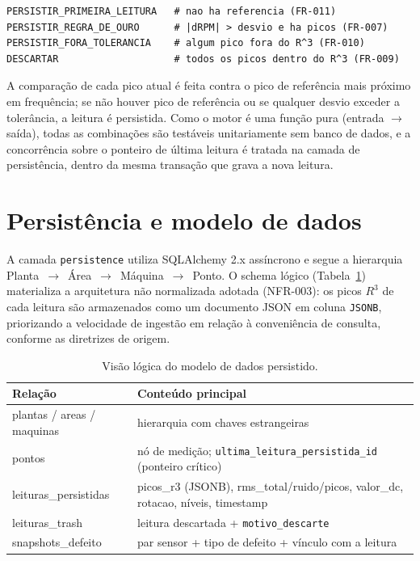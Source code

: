 \begin{verbatim}
PERSISTIR_PRIMEIRA_LEITURA   # nao ha referencia (FR-011)
PERSISTIR_REGRA_DE_OURO      # |dRPM| > desvio e ha picos (FR-007)
PERSISTIR_FORA_TOLERANCIA    # algum pico fora do R^3 (FR-010)
DESCARTAR                    # todos os picos dentro do R^3 (FR-009)
\end{verbatim}


A comparação de cada pico atual é feita contra o pico de referência mais
próximo em frequência; se não houver pico de referência ou se qualquer desvio
exceder a tolerância, a leitura é persistida. Como o motor é uma função pura
(entrada \(\rightarrow\) saída), todas as combinações são testáveis
unitariamente sem banco de dados, e a concorrência sobre o ponteiro de última
leitura é tratada na camada de persistência, dentro da mesma transação que grava
a nova leitura.

\section{Persistência e modelo de dados}

A camada \texttt{persistence} utiliza SQLAlchemy 2.x assíncrono e segue a hierarquia
Planta~$\rightarrow$~Área~$\rightarrow$~Máquina~$\rightarrow$~Ponto. O schema
lógico (Tabela~\ref{tab:schema}) materializa a arquitetura não normalizada
adotada (NFR-003): os picos \(R^3\) de cada leitura são armazenados como um
documento JSON em coluna \texttt{JSONB}, priorizando a velocidade de ingestão em
relação à conveniência de consulta, conforme as diretrizes de origem.

\begin{table}[htbp]
\centering
\caption{Visão lógica do modelo de dados persistido.}
\label{tab:schema}
\begin{tabular}{@{}p{5.2cm}p{7.8cm}@{}}
\toprule
\textbf{Relação} & \textbf{Conteúdo principal} \\
\midrule
plantas / areas / maquinas & hierarquia com chaves estrangeiras \\
pontos & nó de medição; \texttt{ultima\_leitura\_persistida\_id} (ponteiro crítico) \\
leituras\_persistidas & picos\_r3 (JSONB), rms\_total/ruido/picos, valor\_dc, rotacao, níveis, timestamp \\
leituras\_trash & leitura descartada + \texttt{motivo\_descarte} \\
snapshots\_defeito & par sensor + tipo de defeito + vínculo com a leitura \\
\bottomrule
\end{tabular}
\par{}
\end{table}

